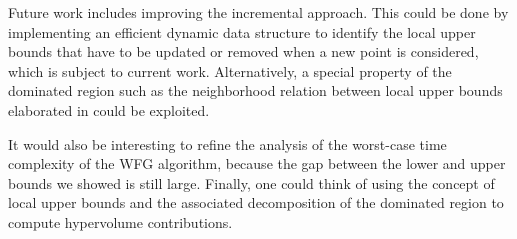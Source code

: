 \documentclass[a4paper,11pt]{article}
\begin{document}
Future work includes improving the incremental approach.
This could be done by implementing an efficient dynamic data structure to identify
the local upper bounds that have to be updated or removed when a new point is considered,
which is subject to current work.
Alternatively, a special property of the dominated region
such as the neighborhood relation between local upper bounds 
elaborated in \cite{DaeKlaLacVan15} could be exploited.

It would also be interesting to refine the analysis 
of the worst-case time complexity of the WFG algorithm,
because the gap between the lower and upper bounds we showed is still large.
Finally, one could think of using the concept of local upper bounds 
and the associated decomposition of the dominated region
to compute hypervolume contributions.




\end{document}
